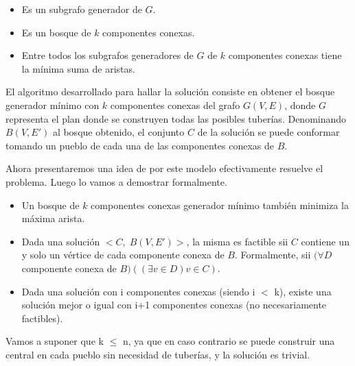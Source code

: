 \begin{itemize}
  \item Es un subgrafo generador de $G$.

  \item Es un bosque de $k$ componentes conexas.

  \item Entre todos los subgrafos generadores de $G$ de $k$ componentes conexas tiene la mínima suma de aristas.
\end{itemize}

El algoritmo desarrollado para hallar la solución consiste en obtener el bosque generador mínimo con $k$ componentes conexas del grafo $G(V,E)$, donde $G$ representa el plan donde se construyen todas las posibles tuberías. Denominando $B(V,E')$ al bosque obtenido, el conjunto $C$ de la solución se puede conformar tomando un pueblo de cada una de las componentes conexas de $B$.

Ahora presentaremos una idea de por este modelo efectivamente resuelve el problema. Luego lo vamos a demostrar formalmente. 

\begin{itemize}
\item Un bosque de $k$ componentes conexas generador mínimo también minimiza la máxima arista.

\item Dada una solución $<C,\;B(V,E')>$, la misma es factible sii $C$ contiene un y solo un vértice de cada componente conexa de $B$. Formalmente, sii $(\forall D$ componente conexa de $B)((\exists v \in D) v \in C)$.  

\item Dada una solución con i componentes conexas (siendo i $<$ k), existe una solución mejor o igual con i+1 componentes conexas (no necesariamente factibles).
\end{itemize}

Vamos a suponer que k $\leq$ n, ya que en caso contrario se puede construir una central en cada pueblo sin necesidad de tuberías, y la solución es trivial.